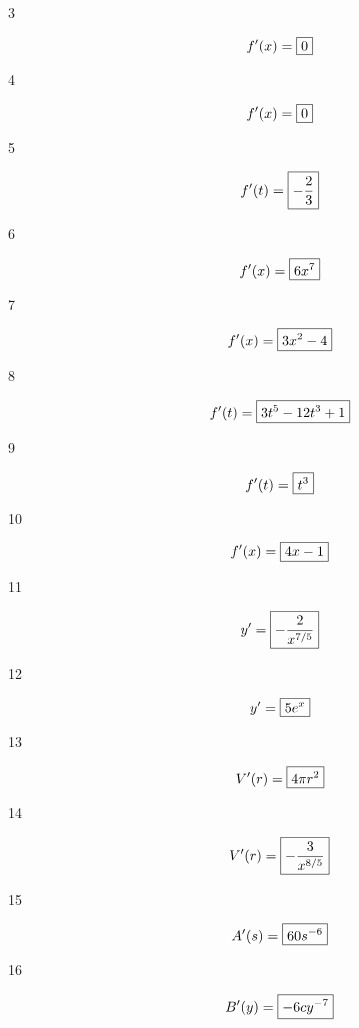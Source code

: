 \documentclass[letterpaper, landscape]{exam}
\begin{document}
  \begin{description}

    \item[3] 
      \[
        f'(x) = \boxed{ 0 } \\
      \]

    \item[4] 
      \[
        f'(x) = \boxed{ 0 } \\
      \]

    \item[5] 
      \[
        f'(t) = \boxed{ - \frac{2}{3} } \\
      \]

    \item[6] 
      \[
        f'(x) = \boxed{ 6 x^7 } \\
      \]

    \item[7] 
      \[
        f'(x) = \boxed{ 3x^2 - 4 } \\
      \]

    \item[8] 
      \[
        f'(t) = \boxed{ 3t^5 - 12t^3 + 1 } \\
      \]

    \item[9] 
      \[
        f'(t) = \boxed{ t^3 } \\
      \]

    \item[10] 
      \[
        f'(x) = \boxed{ 4x - 1 } \\
      \]

    \item[11] 
      \[
        y' = \boxed{ -\frac{2}{x^{7/5}} } \\
      \]

    \item[12] 
      \[
        y' = \boxed{ 5e^x } \\
      \]

    \item[13] 
      \[
        V'(r) = \boxed{ 4 \pi r^2 } \\
      \]

    \item[14] 
      \[
        V'(r) = \boxed{ -\frac{3}{x^{8/5}} } \\
      \]

    \item[15] 
      \[
        A'(s) = \boxed{ 60 s^{-6} } \\
      \]

    \item[16] 
      \[
        B'(y) = \boxed{ -6 c y^{-7} } \\
      \]


\end{description}
\end{document}
